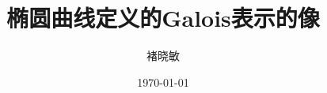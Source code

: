 \documentclass[a4paper, UTF8, CJKmath=true, zihao=5]{ctexrep}
\title{椭圆曲线定义的Galois表示的像}
\author{褚晓敏}
\date{\today}
\begin{document}
    \maketitle

    \begin{abstract}
        
    \end{abstract}

    \renewcommand{\abstractname}{Abstract}

    \begin{abstract}
        
    \end{abstract}

    \tableofcontents

    \clearpage

    

    \printbibliography[heading=bibliography,title=参考文献]
\end{document}
